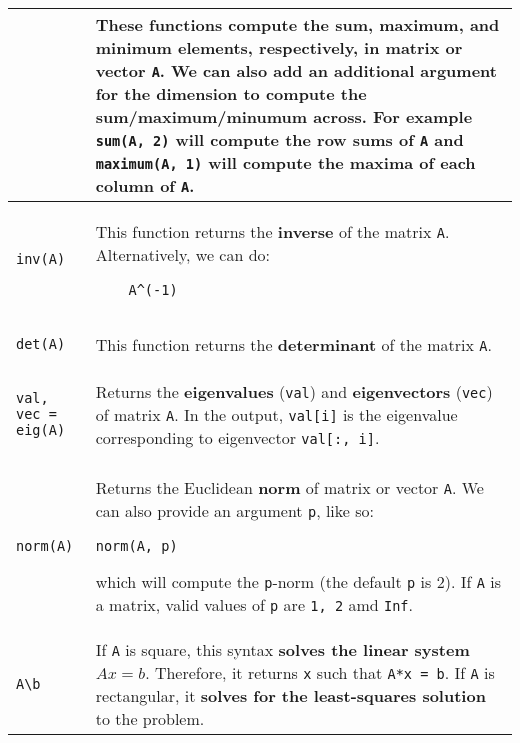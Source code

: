 \documentclass[]{article}
\begin{document}
\begin{longtable}{ |m{6cm}  | m{11cm} |}
\begin{verbatim}
	\end{verbatim}
	& These functions compute the sum, maximum, and minimum elements,
    respectively, in matrix or vector \texttt{A}. We can also add an
    additional argument for the dimension to compute the sum/maximum/minumum
    across. For example \texttt{sum(A, 2)} will compute the row sums of
    \texttt{A} and \texttt{maximum(A, 1)} will compute the maxima of each
    column of \texttt{A}.
    \\\hline
    \begin{verbatim}
inv(A)
	\end{verbatim}
	& This function returns the \textbf{inverse} of the matrix
    \texttt{A}. Alternatively, we can do:
    \begin{verbatim}
    A^(-1)
    \end{verbatim}
    \\\hline
 \begin{verbatim}
det(A)
	\end{verbatim}
	& This function returns the \textbf{determinant} of the matrix
    \texttt{A}.     
    \\\hline
 \begin{verbatim}
val, vec = eig(A)
	\end{verbatim} 
&    Returns the \textbf{eigenvalues} (\texttt{val}) and \textbf{eigenvectors} (\texttt{vec}) of
    matrix \texttt{A}. In the output, \texttt{val[i]} is the eigenvalue
    corresponding to eigenvector \texttt{val[:, i]}.
    \\\hline
 \begin{verbatim}
norm(A)
	\end{verbatim} 
&    Returns the Euclidean \textbf{norm} of matrix or vector \texttt{A}.
We can also provide an argument \texttt{p}, like so:
\begin{verbatim}
norm(A, p)
\end{verbatim}
which will compute the \texttt{p}-norm (the default \texttt{p} is 2). If
\texttt{A} is a matrix, valid values of \texttt{p} are \texttt{1, 2} amd
\texttt{Inf}.
\\\hline
 \begin{verbatim}
A\b
	\end{verbatim} 
&   If \texttt{A} is square, this syntax \textbf{solves the linear system} $Ax = b$.
Therefore, it returns \texttt{x} such that \texttt{A*x = b}.
If \texttt{A} is rectangular, it \textbf{solves for the least-squares
solution} to the
problem.
\\\hline
\end{longtable} 
\end{document}
